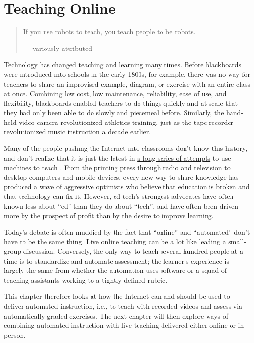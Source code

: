 \chapter{Teaching Online}\label{s:online}

\begin{quote}\setlength{\parindent}{0pt}
If you use robots to teach, you teach people to be robots.

--- variously attributed
\end{quote}

Technology has changed teaching and learning many times. Before
blackboards were introduced into schools in the early 1800s, for
example, there was no way for teachers to share an improvised example,
diagram, or exercise with an entire class at once. Combining low cost,
low maintenance, reliability, ease of use, and flexibility, blackboards
enabled teachers to do things quickly and at scale that they had only
been able to do slowly and piecemeal before. Similarly, the hand-held
video camera revolutionized athletics training, just as the tape
recorder revolutionized music instruction a decade earlier.

Many of the people pushing the Internet into classrooms don't know
this history, and don't realize that it is just the latest in \href{http://teachingmachin.es/timeline.html}{a long
series of attempts} to use machines to teach
\cite{Watt2014}. From the printing press through radio and
television to desktop computers and mobile devices, every new way to
share knowledge has produced a wave of aggressive optimists who
believe that education is broken and that technology can fix
it. However, ed tech's strongest advocates have often known less about
``ed'' than they do about ``tech'', and have often been driven more by the
prospect of profit than by the desire to improve learning.

Today's debate is often muddied by the fact that ``online'' and
``automated'' don't have to be the same thing. Live online teaching
can be a lot like leading a small-group discussion. Conversely, the only
way to teach several hundred people at a time is to standardize and
automate assessment; the learner's experience is largely the same from
whether the automation uses software or a squad of teaching assistants
working to a tightly-defined rubric.

This chapter therefore looks at how the Internet can and should be used
to deliver automated instruction, i.e., to teach with recorded videos
and assess via automatically-graded exercises. The next chapter will
then explore ways of combining automated instruction with live teaching
delivered either online or in person.

